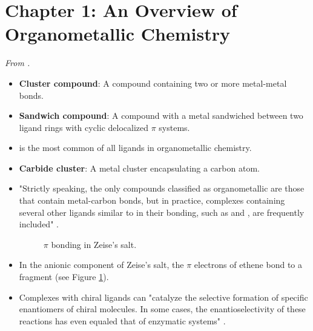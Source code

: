 \documentclass[../notes.tex]{subfiles}
\begin{document}
\section{Chapter 1: An Overview of Organometallic Chemistry}
\emph{From \textcite{bib:SpessardMiessler}.}
\begin{itemize}
    \item {}\textbf{Cluster compound}: A compound containing two or more metal-metal bonds.
    \item \textbf{Sandwich compound}: A compound with a metal sandwiched between two ligand rings with cyclic delocalized $\pi$ systems.
    \item {} is the most common of all ligands in organometallic chemistry.
    \item \textbf{Carbide cluster}: A metal cluster encapsulating a carbon atom.
    \item "Strictly speaking, the only compounds classified as organometallic are those that contain metal-carbon bonds, but in practice, complexes containing several other ligands similar to  in their bonding, such as  and , are frequently included" \parencite[4]{bib:SpessardMiessler}.
    \begin{figure}[h!]
        \centering
        \caption{$\pi$ bonding in Zeise's salt.}
        \label{fig:ZeisesSalt}
    \end{figure}
    \item In the anionic component of Zeise's salt, the $\pi$ electrons of ethene bond to a  fragment (see Figure \ref{fig:ZeisesSalt}).
    \item Complexes with chiral ligands can "catalyze the selective formation of specific enantiomers of chiral molecules. In some cases, the enantioselectivity of these reactions has even equaled that of enzymatic systems" \parencite[7]{bib:SpessardMiessler}.
\end{itemize}
\end{document}
